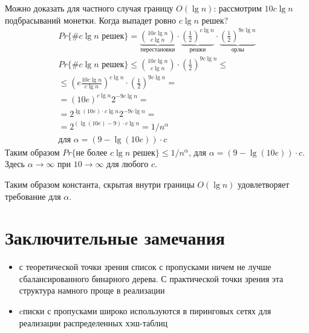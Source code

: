 \documentclass[11pt]{article}
\begin{document}
Можно доказать для частного случая границу $O(\lg n)$: рассмотрим $10 c \lg n$ подбрасываний монетки. Когда выпадет ровно $c \lg n$ решек?
\begin{align*}
  Pr\{\# c \lg n\text{ решек}\} = 
  \underbrace{\binom{10 c \lg n}{c \lg n}}_{\text{перестановки}} \cdot
  \underbrace{{\left(\frac{1}{2}\right)}^{c\lg n}}_{\text{решки}} \cdot
  \underbrace{{\left(\frac{1}{2}\right)}^{9c\lg n}}_{\text{орлы}} \\
  Pr\{\# c \lg n\text{ решек}\} \leqslant \binom{10 c \lg n}{c \lg n} \cdot
  {\left(\frac{1}{2}\right)}^{9c\lg n} \leqslant \\
  \leqslant {\left(e\frac{10 c \lg n}{c \lg n} \right)}^{c\lg n} \cdot
  {\left(\frac{1}{2}\right)}^{9c\lg n} = \\
  = {(10 e)}^{c \lg n} 2^{-9c\lg n} = \\
  = 2^{\lg{(10 e)}\cdot c \lg n}2^{-9c\lg n} = \\
  = 2^{(\lg{(10 e)}-9) \cdot c \lg n} = 1 / n^\alpha \\
  \text{для }\alpha = (9-\lg{(10 e)}) \cdot c
\end{align*}
Таким образом $Pr\{\text{не более }c \lg n\text{ решек}\} \leqslant 1/n^\alpha$, для $\alpha = (9-\lg{(10 e)}) \cdot c$. Здесь $\alpha \to \infty$ при $10 \to \infty$ для любого $c$.

Таким образом константа, скрытая внутри границы $O(\lg n)$ удовлетворяет требование для $\alpha$.

\section{Заключительные замечания}
\begin{itemize}
\item с теоретической точки зрения список с пропусками ничем не лучше сбалансированного бинарного дерева. С практической точки зрения эта структура намного проще в реализации
\item cписки с пропусками широко используются в пиринговых сетях для реализации распределенных хэш-таблиц \cite{Stoica01chord:a} \cite{1124030} \cite{Harvey03skipnet:a}
\end{itemize}



\end{document}
